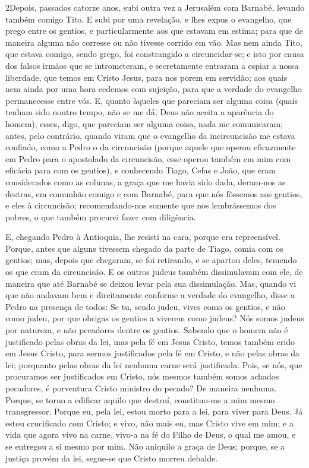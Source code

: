 \medskip

\lettrine{2} Depois, passados catorze anos, subi outra vez a
Jerusalém com Barnabé, levando também comigo Tito. E subi por
uma revelação, e lhes expus o evangelho, que prego entre os gentios,
e particularmente aos que estavam em estima; para que de maneira
alguma não corresse ou não tivesse corrido em vão. Mas nem ainda
Tito, que estava comigo, sendo grego, foi constrangido a
circuncidar-se; e isto por causa dos falsos irmãos que se
intrometeram, e secretamente entraram a espiar a nossa liberdade,
que temos em Cristo Jesus, para nos porem em servidão; aos quais
nem ainda por uma hora cedemos com sujeição, para que a verdade do
evangelho permanecesse entre vós. E, quanto àqueles que pareciam
ser alguma coisa (quais tenham sido noutro tempo, não se me dá; Deus
não aceita a aparência do homem), esses, digo, que pareciam ser
alguma coisa, nada me comunicaram; antes, pelo contrário, quando
viram que o evangelho da incircuncisão me estava confiado, como a
Pedro o da circuncisão (porque aquele que operou eficazmente em
Pedro para o apostolado da circuncisão, esse operou também em mim
com eficácia para com os gentios), e conhecendo Tiago, Cefas e
João, que eram considerados como as colunas, a graça que me havia
sido dada, deram-nos as destras, em comunhão comigo e com Barnabé,
para que nós fôssemos aos gentios, e eles à circuncisão;
recomendando-nos somente que nos lembrássemos dos pobres, o
que também procurei fazer com diligência.

E, chegando Pedro à Antioquia, lhe resisti na cara, porque era
repreensível. Porque, antes que alguns tivessem chegado da
parte de Tiago, comia com os gentios; mas, depois que chegaram, se
foi retirando, e se apartou deles, temendo os que eram da
circuncisão. E os outros judeus também dissimulavam com ele,
de maneira que até Barnabé se deixou levar pela sua dissimulação.
Mas, quando vi que não andavam bem e direitamente conforme a
verdade do evangelho, disse a Pedro na presença de todos: Se tu,
sendo judeu, vives como os gentios, e não como judeu, por que
obrigas os gentios a viverem como judeus? Nós somos judeus
por natureza, e não pecadores dentre os gentios. Sabendo que
o homem não é justificado pelas obras da lei, mas pela fé em Jesus
Cristo, temos também crido em Jesus Cristo, para sermos justificados
pela fé em Cristo, e não pelas obras da lei; porquanto pelas obras
da lei nenhuma carne será justificada. Pois, se nós, que
procuramos ser justificados em Cristo, nós mesmos também somos
achados pecadores, é porventura Cristo ministro do pecado? De
maneira nenhuma. Porque, se torno a edificar aquilo que
destruí, constituo-me a mim mesmo transgressor. Porque eu,
pela lei, estou morto para a lei, para viver para Deus. Já
estou crucificado com Cristo; e vivo, não mais eu, mas Cristo vive
em mim; e a vida que agora vivo na carne, vivo-a na fé do Filho de
Deus, o qual me amou, e se entregou a si mesmo por mim. Não
aniquilo a graça de Deus; porque, se a justiça provém da lei,
segue-se que Cristo morreu debalde.


